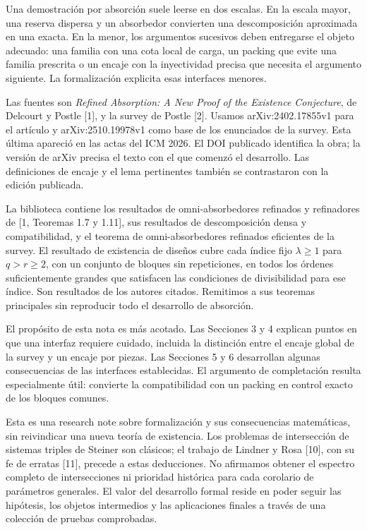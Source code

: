\documentclass[spanish,11pt,a4paper]{article}
\begin{document}
Una demostración por absorción suele leerse en dos escalas. En la escala mayor, una reserva dispersa y un absorbedor convierten una descomposición aproximada en una exacta. En la menor, los argumentos sucesivos deben entregarse el objeto adecuado: una familia con una cota local de carga, un packing que evite una familia prescrita o un encaje con la inyectividad precisa que necesita el argumento siguiente. La formalización explicita esas interfaces menores.

Las fuentes son \emph{Refined Absorption: A New Proof of the Existence Conjecture}, de Delcourt y Postle {[}1{]}, y la survey de Postle {[}2{]}. Usamos arXiv:2402.17855v1 para el artículo y arXiv:2510.19978v1 como base de los enunciados de la survey. Esta última apareció en las actas del ICM 2026. El DOI publicado identifica la obra; la versión de arXiv precisa el texto con el que comenzó el desarrollo. Las definiciones de encaje y el lema pertinentes también se contrastaron con la edición publicada.

La biblioteca contiene los resultados de omni-absorbedores refinados y refinadores de {[}1, Teoremas 1.7 y 1.11{]}, sus resultados de descomposición densa y compatibilidad, y el teorema de omni-absorbedores refinados eficientes de la survey. El resultado de existencia de diseños cubre cada índice fijo \(\lambda\ge1\) para \(q>r\ge2\), con un conjunto de bloques sin repeticiones, en todos los órdenes suficientemente grandes que satisfacen las condiciones de divisibilidad para ese índice. Son resultados de los autores citados. Remitimos a sus teoremas principales sin reproducir todo el desarrollo de absorción.

El propósito de esta nota es más acotado. Las Secciones 3 y 4 explican puntos en que una interfaz requiere cuidado, incluida la distinción entre el encaje global de la survey y un encaje por piezas. Las Secciones 5 y 6 desarrollan algunas consecuencias de las interfaces establecidas. El argumento de completación resulta especialmente útil: convierte la compatibilidad con un packing en control exacto de los bloques comunes.

Esta es una research note sobre formalización y sus consecuencias matemáticas, sin reivindicar una nueva teoría de existencia. Los problemas de intersección de sistemas triples de Steiner son clásicos; el trabajo de Lindner y Rosa {[}10{]}, con su fe de erratas {[}11{]}, precede a estas deducciones. No afirmamos obtener el espectro completo de intersecciones ni prioridad histórica para cada corolario de parámetros generales. El valor del desarrollo formal reside en poder seguir las hipótesis, los objetos intermedios y las aplicaciones finales a través de una colección de pruebas comprobadas.
\end{document}
